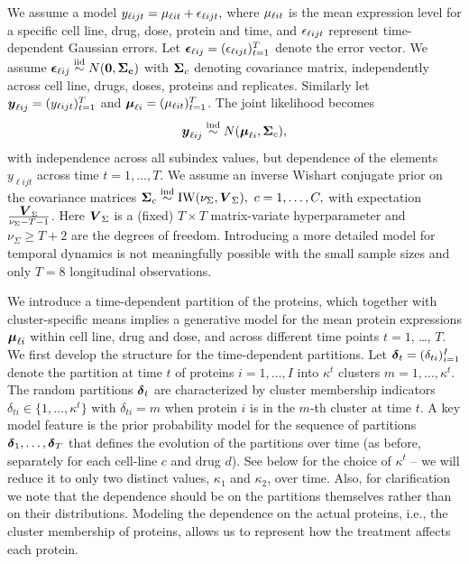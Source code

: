We assume a model $y_{\ell ijt} = \mu_{\ell it} + \epsilon_{\ell ijt},$ where $\mu_{\ell it}$ is the mean expression level for a specific cell line, drug, dose, protein and time, and $\epsilon_{\ell ijt}$ represent time-dependent
Gaussian errors.
%
Let $\mbox{\boldmath $\epsilon$}_{\ell ij} = (\epsilon_{\ell ijt})^T_{t=1}$
denote the error vector. We assume $\mbox{\boldmath $\epsilon$}_{\ell ij} \stackrel{\mbox{\scriptsize iid}}{\sim} N(\bf0,
\mbox{\boldmath $\Sigma$}_c)$ with $\mbox{\boldmath $\Sigma$}_c$ denoting covariance matrix, independently across cell line, drugs, doses, proteins and
replicates. Similarly let $\mbox{\boldmath $y$}_{\ell ij} = (y_{\ell ijt})^T_{t=1}$ and $\mbox{\boldmath $\mu$}_{\ell i} = (\mu_{\ell it})^{T}_{t=1}$. The joint likelihood becomes
\begin{equation} \mbox{\boldmath $y$}_{\ell ij} \stackrel{\mbox{\scriptsize ind}}{\sim} N(\mbox{\boldmath $\mu$}_{\ell i}, \mbox{\boldmath $\Sigma$}_c),
  \label{eq:lik}
\end{equation} with independence across all subindex values, but dependence of the elements $y_{\ell ijt}$ across time $t=1,
\ldots, T$. We assume an inverse Wishart conjugate prior on the
covariance matrices $\mbox{\boldmath $\Sigma$}_c \stackrel{\mbox{\scriptsize ind}}{\sim} \mbox{IW}(\nu_{\Sigma}, \mbox{\boldmath $V$}_{\Sigma}),
\ c=1, \ldots, C,$ with expectation $\frac{\mbox{\boldmath $V$}_{\Sigma}}{\nu_{\Sigma}
- T - 1}$.
Here $\mbox{\boldmath $V$}_{\Sigma}$  is a (fixed) $T \times T$ matrix-variate hyperparameter
and $\nu_{\Sigma} \geq T + 2$ are the degrees of freedom. Introducing a more detailed model for temporal dynamics is
not meaningfully possible with the small sample sizes and only $T=8$
longitudinal observations. 

We introduce a time-dependent partition of the proteins, which
together with cluster-specific means implies a generative model for
the mean protein expressions $\mbox{\boldmath $\mu$}_{\ell i}$ within cell line, drug and
dose, and across different time points $t=1$, \ldots, $T$. We first
develop the structure for the time-dependent partitions.
Let $\mbox{\boldmath $\delta$}_t=(\delta_{ti})^I_{i=1}$
denote the partition at time $t$
of proteins $i=1, \ldots, I$ into $\kappa^t$ clusters
$m=1,\ldots,\kappa^t$.
The random partitions $\mbox{\boldmath $\delta$}_t$ are characterized by cluster
membership indicators $\delta_{ti} \in \{1, \ldots, \kappa^t\}$ 
with $\delta_{ti} = m$ when protein $i$ is in the $m$-th cluster at time $t$.
A key model feature is the
prior probability model for the sequence of partitions
$\mbox{\boldmath $\delta$}_{1}, \ldots, \mbox{\boldmath $\delta$}_{T}$
that defines the evolution of the partitions over
time (as before, separately for each cell-line $c$ and drug $d$).
See below for the choice of $\kappa^t$ -- we will reduce it to only
two distinct values, $\kappa_1$ and $\kappa_2$, over time.
Also, for clarification we note that the dependence should be on the
partitions themselves rather than on their distributions.
Modeling the dependence on the actual proteins, i.e.,
the cluster membership of proteins, allows us to represent how the
treatment affects each protein.

